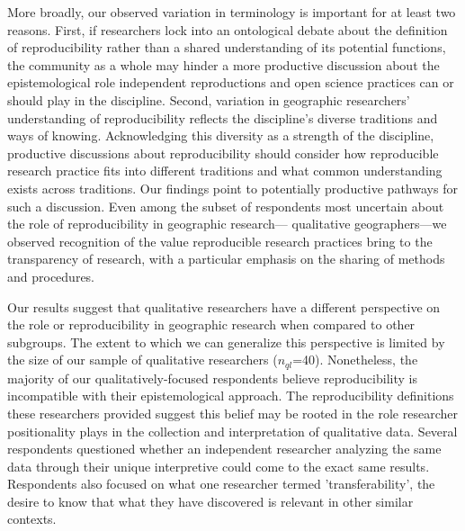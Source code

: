 \documentclass[]{interact}
\theoremstyle{plain}%
\theoremstyle{definition}
\theoremstyle{remark}
\begin{document}
More broadly, our observed variation in terminology is important for at least two reasons. 
First, if researchers lock into an ontological debate about the definition of reproducibility rather than a shared understanding of its potential functions, the community as a whole may hinder a more productive discussion about the epistemological role independent reproductions and open science practices can or should play in the discipline. 
Second, variation in geographic researchers' understanding of reproducibility reflects the discipline's diverse traditions and ways of knowing. 
Acknowledging this diversity as a strength of the discipline, productive discussions about reproducibility should consider how reproducible research practice fits into different traditions and what common understanding exists across traditions. 
Our findings point to potentially productive pathways for such a discussion. 
Even among the subset of respondents most uncertain about the role of reproducibility in geographic research--- qualitative geographers---we observed recognition of the value reproducible research practices bring to the transparency of research, with a particular emphasis on the sharing of methods and procedures.   

Our results suggest that qualitative researchers have a different perspective on the role or reproducibility in geographic research when compared to other subgroups.
The extent to which we can generalize this perspective is limited by the size of our sample of qualitative researchers (\textit{$n_{ql}$}=40).  
Nonetheless, the majority of our qualitatively-focused respondents believe reproducibility is incompatible with their epistemological approach.  
The reproducibility definitions these researchers provided suggest this belief may be rooted in the role researcher positionality plays in the collection and interpretation of qualitative data. 
Several respondents questioned whether an independent researcher analyzing the same data through their unique interpretive could come to the exact same results. 
Respondents also focused on what one researcher termed 'transferability', the desire to know that what they have discovered is relevant in other similar contexts. 
\end{document}
